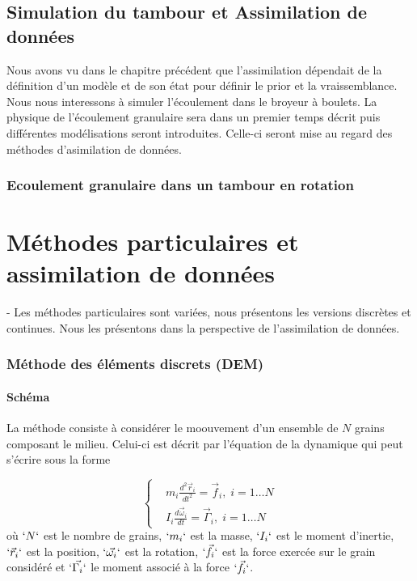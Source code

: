 
\chapter{Simulation du tambour et Assimilation de données}

Nous avons vu dans le chapitre précédent que l'assimilation dépendait de la définition d'un modèle et de son état pour définir le prior et la vraissemblance. Nous nous interessons à simuler l'écoulement dans le broyeur à boulets. La physique de l'écoulement granulaire sera dans un premier temps décrit puis différentes modélisations seront introduites. Celle-ci seront mise au regard des méthodes d'asimilation de données.

\section{Ecoulement granulaire dans un tambour en rotation}

\part{Méthodes particulaires et assimilation de données}

- Les méthodes particulaires sont variées, nous présentons les versions discrètes et continues. Nous les présentons dans la perspective de l'assimilation de données.

\section{Méthode des éléments discrets (DEM)}

\subsection{Schéma}

La méthode consiste à considérer le moouvement d'un ensemble de $N$ grains composant le milieu. Celui-ci est décrit par l'équation de la dynamique qui peut s'écrire sous la forme

\begin{equation*}
    \left\{
    \begin{aligned}
         & m_{i} \frac{ d^{2}\vec{r}_i }{dt^2}=\vec{f}_{i},\; i=1\ldots N      \\
         & I_{i} \frac{d \vec{\omega}_{i}}{dt}=\vec{\Gamma}_{i},\; i=1\ldots N
    \end{aligned}
    \right.
\end{equation*}où $`N`$ est le nombre de grains, $`m_{i}`$ est la masse, $`I_i`$ est le moment d'inertie, $`\vec{r}_{i}`$ est la position, $`\vec{\omega_{i}}`$ est la rotation, $`\vec{f}_{i}`$ est la force exercée sur le grain considéré et $`\vec{\Gamma_{i}}`$ le moment associé à la force $`\vec{f}_{i}`$.

